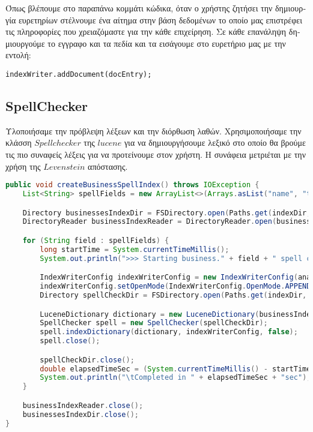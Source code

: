 \textgreek{
Όπως βλέπουμε στο παραπάνω κομμάτι κώδικα, όταν ο χρήστης ζητήσει την δημιουργία ευρετηρίων στέλνουμε ένα αίτημα
στην βάση δεδομένων το οποίο μας επιστρέφει τις πληροφορίες που χρειαζόμαστε για την κάθε επιχείρηση. Σε κάθε επανάληψη
δημιουργούμε το εγγραφο και τα πεδία και τα εισάγουμε στο ευρετήριο μας με την εντολή:
}
\lstset{style=secondStyle}
\begin{lstlisting}
indexWriter.addDocument(docEntry);
\end{lstlisting}

\subsection{SpellChecker}
\textgreek{
Υλοποιήσαμε την πρόβλεψη λέξεων και την διόρθωση λαθών. Χρησιμοποιήσαμε την κλάσση $Spellchecker$ της $lucene$ για να
δημιουργήσουμε λεξικό στο οποίο θα βρούμε τις πιο συναφείς λέξεις για να προτείνουμε στον χρήστη. Η συνάφεια
μετριέται με την χρήση της $Levenstein$ απόστασης.
}
\lstset{style=mystyle}
\begin{lstlisting}[language=Java]
public void createBusinessSpellIndex() throws IOException {
    List<String> spellFields = new ArrayList<>(Arrays.asList("name", "tip", "review", "categories"));

    Directory businessesIndexDir = FSDirectory.open(Paths.get(indexDir, "businesses"));
    DirectoryReader businessIndexReader = DirectoryReader.open(businessesIndexDir);

    for (String field : spellFields) {
        long startTime = System.currentTimeMillis();
        System.out.println(">>> Starting business." + field + " spell check indexing");

        IndexWriterConfig indexWriterConfig = new IndexWriterConfig(analyzer);
        indexWriterConfig.setOpenMode(IndexWriterConfig.OpenMode.APPEND);
        Directory spellCheckDir = FSDirectory.open(Paths.get(indexDir, "spell_check_business"));

        LuceneDictionary dictionary = new LuceneDictionary(businessIndexReader, field);
        SpellChecker spell = new SpellChecker(spellCheckDir);
        spell.indexDictionary(dictionary, indexWriterConfig, false);
        spell.close();

        spellCheckDir.close();
        double elapsedTimeSec = (System.currentTimeMillis() - startTime) / 1000.0;
        System.out.println("\tCompleted in " + elapsedTimeSec + "sec");
    }

    businessIndexReader.close();
    businessesIndexDir.close();
}


\end{lstlisting}
